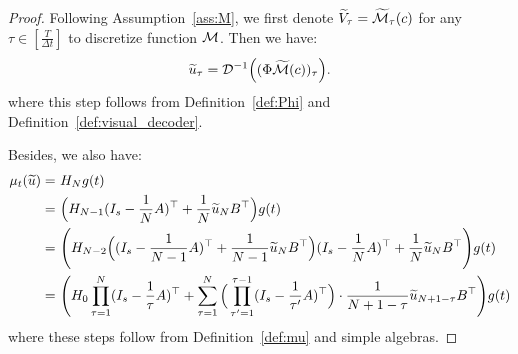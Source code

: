 \begin{proof}
    Following Assumption~\ref{ass:M}, we first denote $\widetilde{V}_{\tau} = \widetilde{{\cal M}}_\tau(c)$ for any $\tau \in [\frac{T}{\Delta t}]$ to discretize function ${\cal M}$. Then we have:
    \begin{align}\label{eq:wt_u_func}
        \widetilde{u}_{\tau} = {\cal D}^{-1}\Big( (\Phi \widetilde{{\cal M}}(c))_\tau \Big).
    \end{align}
    where this step follows from Definition~\ref{def:Phi} and Definition~\ref{def:visual_decoder}.

    Besides, we also have:
    \begin{align}\label{eq:mu_func}
        \mu_t(\widetilde{u}) = & ~ H_N g(t) \notag \\
        = & ~ \Big( H_{N-1} ( I_s - \frac{1}{N} A )^\top + \frac{1}{N} \widetilde{u}_{N} B^\top \Big) g(t) \notag\\
        = & ~ \Bigg( H_{N-2} \Big ( (I_s - \frac{1}{N-1} A )^\top + \frac{1}{N-1} \widetilde{u}_{N} B^\top \Big) ( I_s - \frac{1}{N} A )^\top + \frac{1}{N} \widetilde{u}_{N} B^\top \Bigg) g(t) \notag\\
        = & ~ \Bigg( H_0 \prod_{\tau=1}^N (I_s - \frac{1}{\tau}A)^\top + \sum_{\tau=1}^N \Big( \prod_{\tau'=1}^{\tau - 1} (I_s - \frac{1}{\tau'} A )^\top\Big) \cdot \frac{1}{N+1-\tau} \widetilde{u}_{N+1-\tau} B^\top \Bigg) g(t)
    \end{align}
    where these steps follow from Definition~\ref{def:mu} and simple algebras.


\end{proof}
